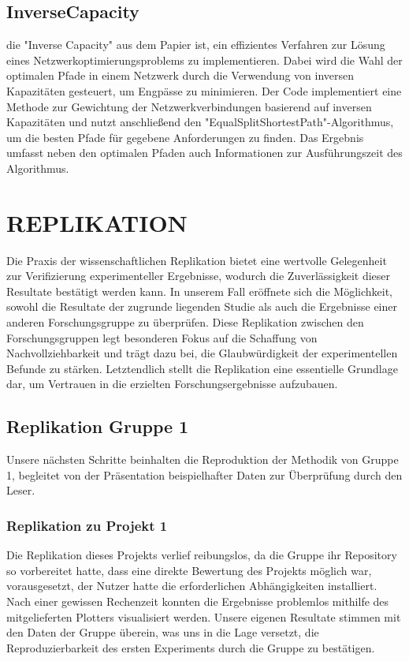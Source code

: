 \documentclass[sigconf, nonacm, review]{acmart}
\begin{document}
\subsection{InverseCapacity}
die "Inverse Capacity" aus dem Papier \cite{foerster2021} ist, ein effizientes Verfahren zur Lösung eines Netzwerkoptimierungsproblems zu implementieren. Dabei wird die Wahl der optimalen Pfade in einem Netzwerk durch die Verwendung von inversen Kapazitäten gesteuert, um Engpässe zu minimieren. Der Code implementiert eine Methode zur Gewichtung der Netzwerkverbindungen basierend auf inversen Kapazitäten und nutzt anschließend den "EqualSplitShortestPath"-Algorithmus, um die besten Pfade für gegebene Anforderungen zu finden. Das Ergebnis umfasst neben den optimalen Pfaden auch Informationen zur Ausführungszeit des Algorithmus.

\section{REPLIKATION}
{Die Praxis der wissenschaftlichen Replikation bietet eine wertvolle Gelegenheit zur Verifizierung experimenteller Ergebnisse, wodurch die Zuverlässigkeit dieser Resultate bestätigt werden kann. In unserem Fall eröffnete sich die Möglichkeit, sowohl die Resultate der zugrunde liegenden Studie als auch die Ergebnisse einer anderen Forschungsgruppe zu überprüfen. Diese Replikation zwischen den Forschungsgruppen legt besonderen Fokus auf die Schaffung von Nachvollziehbarkeit und trägt dazu bei, die Glaubwürdigkeit der experimentellen Befunde zu stärken. Letztendlich stellt die Replikation eine essentielle Grundlage dar, um Vertrauen in die erzielten Forschungsergebnisse aufzubauen.}

\subsection{Replikation Gruppe 1}
{Unsere nächsten Schritte beinhalten die Reproduktion der Methodik von Gruppe 1, begleitet von der Präsentation beispielhafter Daten zur Überprüfung durch den Leser.}
\subsubsection{Replikation zu Projekt 1}
{Die Replikation dieses Projekts \cite{replication-group1-pro1} verlief reibungslos, da die Gruppe ihr Repository so vorbereitet hatte, dass eine direkte Bewertung des Projekts möglich war, vorausgesetzt, der Nutzer hatte die erforderlichen Abhängigkeiten installiert. Nach einer gewissen Rechenzeit konnten die Ergebnisse problemlos mithilfe des mitgelieferten Plotters visualisiert werden. Unsere eigenen Resultate stimmen mit den Daten der Gruppe überein, was uns in die Lage versetzt, die Reproduzierbarkeit des ersten Experiments durch die Gruppe zu bestätigen.}
\end{document}
